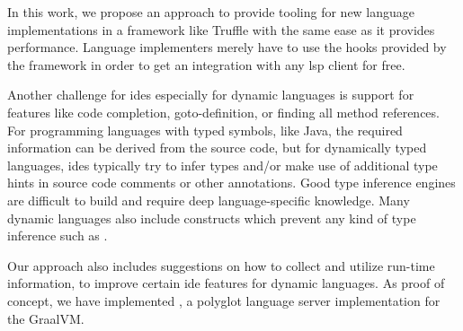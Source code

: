 \documentclass[sigplan,10pt,review,anonymous]{acmart}
\begin{document}
In this work, we propose an approach to provide tooling for new language
implementations in a framework like Truffle with the same ease as it provides
performance. Language implementers merely have to use the hooks provided by the
framework in order to get an integration with any \ac{lsp} client for free.



Another challenge for \acp{ide} especially for dynamic languages is support for
features like code completion, goto-definition, or finding all method
references. For programming languages with typed symbols, like Java, the
required information can be derived from the source code, but for dynamically
typed languages, \acp{ide} typically try to infer types and/or make use of
additional type hints in source code comments or other annotations. Good type
inference engines are difficult to build and require deep language-specific
knowledge. Many dynamic languages also include constructs which prevent any kind
of type inference such as .

Our approach also includes suggestions on how to collect and utilize run-time
information, to improve certain \ac{ide} features for dynamic languages. As
proof of concept, we have implemented \graallsp, a polyglot language server
implementation for the GraalVM.
\end{document}
